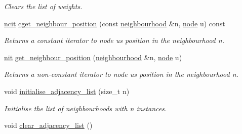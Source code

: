 \begin{DoxyCompactItemize}
\begin{DoxyCompactList}\small\item\em Clears the list of weights. \end{DoxyCompactList}\item 
\hyperlink{namespacelgraph_1_1utils_a7207b078932845778282f5e2e373575b}{ncit} \hyperlink{classlgraph_1_1utils_1_1xxgraph_af72476b0919eacd6e9b044f7c5528c1e}{cget\+\_\+neighbour\+\_\+position} (const \hyperlink{namespacelgraph_1_1utils_a0f2ef47028a466d26841709e705390ac}{neighbourhood} \&n, \hyperlink{namespacelgraph_1_1utils_ab9c6b34241f0b68372c55f34c460e863}{node} u) const 
\begin{DoxyCompactList}\small\item\em Returns a constant iterator to node {\itshape u\textquotesingle{}s} position in the neighbourhood {\itshape n}. \end{DoxyCompactList}\item 
\hyperlink{namespacelgraph_1_1utils_af5daf6fe356a9014746bdb507787ae01}{nit} \hyperlink{classlgraph_1_1utils_1_1xxgraph_ab2ac2eb4cdc6c369cde7c71a1c3b8858}{get\+\_\+neighbour\+\_\+position} (\hyperlink{namespacelgraph_1_1utils_a0f2ef47028a466d26841709e705390ac}{neighbourhood} \&n, \hyperlink{namespacelgraph_1_1utils_ab9c6b34241f0b68372c55f34c460e863}{node} u)
\begin{DoxyCompactList}\small\item\em Returns a non-\/constant iterator to node {\itshape u\textquotesingle{}s} position in the neighbourhood {\itshape n}. \end{DoxyCompactList}\item 
void \hyperlink{classlgraph_1_1utils_1_1xxgraph_a2201aaff5e9ffa29a9b3abfde705dd46}{initialise\+\_\+adjacency\+\_\+list} (size\+\_\+t n)\hypertarget{classlgraph_1_1utils_1_1xxgraph_a2201aaff5e9ffa29a9b3abfde705dd46}{}\label{classlgraph_1_1utils_1_1xxgraph_a2201aaff5e9ffa29a9b3abfde705dd46}

\begin{DoxyCompactList}\small\item\em Initialise the list of neighbourhoods with {\itshape n} instances. \end{DoxyCompactList}\item 
void \hyperlink{classlgraph_1_1utils_1_1xxgraph_a6523402d0ec66918b95de23d2bee38fc}{clear\+\_\+adjacency\+\_\+list} ()\hypertarget{classlgraph_1_1utils_1_1xxgraph_a6523402d0ec66918b95de23d2bee38fc}{}\label{classlgraph_1_1utils_1_1xxgraph_a6523402d0ec66918b95de23d2bee38fc}


\end{DoxyCompactItemize}
